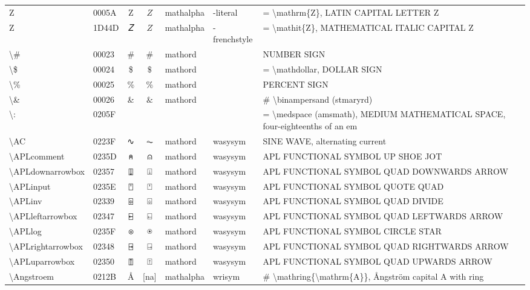 \documentclass[a4paper,landscape]{article}
\begin{document}
\begin{longtable}{llcclll}
Z & 0005A & Z & $Z$ & mathalpha & -literal & = \textbackslash{}mathrm\{Z\}, LATIN CAPITAL LETTER Z \\
Z & 1D44D & 𝑍 & $Z$ & mathalpha & -frenchstyle & = \textbackslash{}mathit\{Z\}, MATHEMATICAL ITALIC CAPITAL Z \\
\textbackslash{}\# & 00023 & \# & $\#$ & mathord &  & NUMBER SIGN \\
\textbackslash{}\$ & 00024 & \$ & $\$$ & mathord &  & = \textbackslash{}mathdollar, DOLLAR SIGN \\
\textbackslash{}\% & 00025 & \% & $\%$ & mathord &  & PERCENT SIGN \\
\textbackslash{}\& & 00026 & \& & $\&$ & mathord &  & \# \textbackslash{}binampersand (stmaryrd) \\
\textbackslash{}: & 0205F &   & $\:$ &  &  & = \textbackslash{}medspace (amsmath), MEDIUM MATHEMATICAL SPACE, four-eighteenths of an em \\
\textbackslash{}AC & 0223F & ∿ & $\AC$ & mathord & wasysym & SINE WAVE, alternating current \\
\textbackslash{}APLcomment & 0235D & \texttt ⍝ & $\APLcomment$ & mathord & wasysym & APL FUNCTIONAL SYMBOL UP SHOE JOT \\
\textbackslash{}APLdownarrowbox & 02357 & \texttt ⍗ & $\APLdownarrowbox$ & mathord & wasysym & APL FUNCTIONAL SYMBOL QUAD DOWNWARDS ARROW \\
\textbackslash{}APLinput & 0235E & \texttt ⍞ & $\APLinput$ & mathord & wasysym & APL FUNCTIONAL SYMBOL QUOTE QUAD \\
\textbackslash{}APLinv & 02339 & \texttt ⌹ & $\APLinv$ & mathord & wasysym & APL FUNCTIONAL SYMBOL QUAD DIVIDE \\
\textbackslash{}APLleftarrowbox & 02347 & \texttt ⍇ & $\APLleftarrowbox$ & mathord & wasysym & APL FUNCTIONAL SYMBOL QUAD LEFTWARDS ARROW \\
\textbackslash{}APLlog & 0235F & \texttt ⍟ & $\APLlog$ & mathord & wasysym & APL FUNCTIONAL SYMBOL CIRCLE STAR \\
\textbackslash{}APLrightarrowbox & 02348 & \texttt ⍈ & $\APLrightarrowbox$ & mathord & wasysym & APL FUNCTIONAL SYMBOL QUAD RIGHTWARDS ARROW \\
\textbackslash{}APLuparrowbox & 02350 & \texttt ⍐ & $\APLuparrowbox$ & mathord & wasysym & APL FUNCTIONAL SYMBOL QUAD UPWARDS ARROW \\
\textbackslash{}Angstroem & 0212B & Å & [na] & mathalpha & wrisym & \# \textbackslash{}mathring\{\textbackslash{}mathrm\{A\}\}, Ångström capital A with ring \\

\end{longtable}
\end{document}
